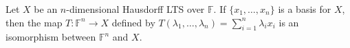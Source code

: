 Let $X$ be an $n$-dimensional Hausdorff LTS over $\mathbb{F}$. If $\{x_1,\ldots,x_n\}$ is a basis for $X$, then the map $T: \mathbb{F}^n \to X$ defined by $T(\lambda_1,\ldots,\lambda_n) = \sum_{i=1}^n \lambda_i x_i$ is an isomorphism between $\mathbb{F}^n$ and $X$.